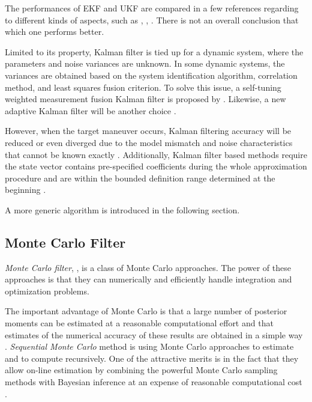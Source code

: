 The performances of EKF and UKF are compared in a few references regarding to different kinds of aspects, such as \cite{chandrasekar2007comparison}, \cite{laviola2003comparison}, \cite{st2004comparison}. There is not an overall conclusion that which one performs better. 


Limited to its property, Kalman filter is tied up for a dynamic system, where the parameters and noise variances are unknown. In some dynamic systems, the variances are obtained based on the system identification algorithm, correlation method, and least squares fusion criterion. To solve this issue, a self-tuning weighted measurement fusion Kalman filter is proposed by \cite{ran2010self}. Likewise, a new adaptive Kalman filter will be another choice \cite{oussalah2001adaptive}. 


However, when the target maneuver occurs, Kalman filtering accuracy will be reduced or even diverged due to the model mismatch and noise characteristics that cannot be known exactly \cite{liu2014filtering}. Additionally, Kalman filter based methods require the state vector contains pre-specified coefficients during the whole approximation procedure and are within the bounded definition range determined at the beginning \cite{jauch2017recursive}. 

A more generic algorithm is introduced in the following section. 


\subsection*{Monte Carlo Filter}

\textit{Monte Carlo filter}, \cite{chen2003bayesian},  is a class of Monte Carlo approaches. The power of these approaches is that they can numerically and efficiently handle integration and optimization problems. 

The important advantage of Monte Carlo is that a large number of posterior moments can be estimated at a reasonable computational effort and that estimates of the numerical accuracy of these results are obtained in a simple way \cite{kloek1978bayesian}. \textit{Sequential Monte Carlo} method is using Monte Carlo approaches to estimate and to compute recursively. One of the attractive merits is in the fact that they allow on-line estimation by combining the powerful Monte Carlo sampling methods with Bayesian inference at an expense of reasonable computational cost \cite{chen2003bayesian}. 

